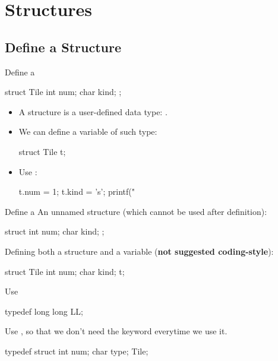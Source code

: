 \documentclass{beamer}
\begin{document}
\section{Structures}

\subsection{Define a Structure}

\begin{frame}[fragile]{Define a }
    \begin{cpp}
struct Tile {
  int num;
  char kind;
};
    \end{cpp}
    \pause
    \begin{itemize}
        \item A structure is a user-defined data type: .
        \item We can define a variable of such type:
        \begin{cpp}
struct Tile t;
        \end{cpp}
        \pause
        \item Use :
        \begin{cpp}
t.num = 1;
t.kind = 's';
printf("%
        \end{cpp}
    \end{itemize}
\end{frame}

\begin{frame}[fragile]{Define a }
    An unnamed structure (which cannot be used after definition):
    \begin{cpp}
struct {
  int num;
  char kind;
};
    \end{cpp}
    \pause
    Defining both a structure and a variable (\textbf{not suggested coding-style}):
    \begin{cpp}
struct Tile {
  int num;
  char kind;
} t;
    \end{cpp}
\end{frame}

\begin{frame}[fragile]{Use }
    \begin{cpp}
typedef long long LL;
    \end{cpp}
    Use , so that we don't need the  keyword everytime we use it.
    \begin{cpp}
typedef struct {
  int num;
  char type;
} Tile;
    \end{cpp}
\end{frame}
\end{document}
